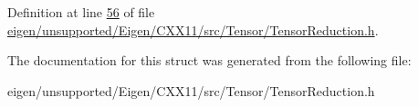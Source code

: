 Definition at line \hyperlink{eigen_2unsupported_2_eigen_2_c_x_x11_2src_2_tensor_2_tensor_reduction_8h_source_l00056}{56} of file \hyperlink{eigen_2unsupported_2_eigen_2_c_x_x11_2src_2_tensor_2_tensor_reduction_8h_source}{eigen/unsupported/\+Eigen/\+C\+X\+X11/src/\+Tensor/\+Tensor\+Reduction.\+h}.



The documentation for this struct was generated from the following file\+:\begin{DoxyCompactItemize}
\item 
eigen/unsupported/\+Eigen/\+C\+X\+X11/src/\+Tensor/\+Tensor\+Reduction.\+h\end{DoxyCompactItemize}

